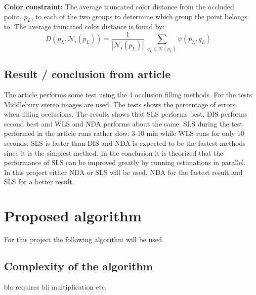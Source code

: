 \textbf{Color constraint:} The average truncated color distance from the occluded point, $p_L$, to each of the two groups to determine which group the point belongs to. The average truncated color distance is found by:
\begin{equation}
D(p_L,\mathcal{N}_i(p_L) ) = \dfrac{1}{|\mathcal{N}_i(p_L)|} \; \sum_{q_L \in \mathcal{N}(p_L)} \psi (p_L,q_L) 
\end{equation}

\subsection{Result / conclusion from article}
The article performs some test using the 4 occlusion filling methods. For the tests Middlebury stereo images are used. The tests shows the percentage of errors when filling occlusions. The results shows that SLS performs best, DIS performs second best and WLS and NDA performs about the same. SLS during the test performed in the article runs rather slow: 3-10 min while WLS runs for only 10 seconds. SLS is faster than DIS and NDA is expected to be the fastest methods since it is the simplest method. In the conclusion it is theorized that the performance of SLS can be improved greatly by running estimations in parallel. \\
In this project either NDA or SLS will be used. NDA for the fastest result and SLS for a better result.

\section{Proposed algorithm}
For this project the following algorithm will be used. 

\subsection{Complexity of the algorithm}
bla requires bli multiplication etc.



